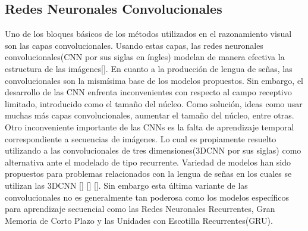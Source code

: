 \subsection{Redes Neuronales Convolucionales}\label{subsection:state-of-the-art:slp:CNN}
Uno de los bloques básicos de los métodos utilizados en el razonamiento visual son las capas convolucionales. Usando estas capas, las redes neuronales convolucionales(CNN por sus siglas en íngles) modelan de manera efectiva la estructura de las imágenes[\cite{LeCun1998GradientbasedLA}]. En cuanto a la producción de lengua de señas, las convolucionales son la mismísima base de los modelos propuestos. Sin embargo, el desarrollo de las CNN enfrenta inconvenientes con respecto al campo receptivo limitado, introducido como el tamaño del núcleo. Como solución, ideas como usar muchas más capas convolucionales, aumentar el tamaño del núcleo, entre otras. Otro inconveniente importante de las CNNs es la falta de aprendizaje temporal correspondiente a secuencias de imágenes. Lo cual es propiamente resuelto utilizando a las convolucionales de tres dimensiones(3DCNN por sus siglas) como alternativa ante el modelado de tipo recurrente. Variedad de modelos han sido propuestos para problemas relacionados con la lengua de señas en los cuales se utilizan las 3DCNN [\cite{Sharma2021ASL3DCNNAS}] [\cite{AlHammadi2020HandGR}] [\cite{2019ProceedingsOT}]. Sin embargo esta última variante de las convolucionales no es generalmente tan poderosa como los modelos específicos para aprendizaje secuencial como las Redes Neuronales Recurrentes, Gran Memoria de Corto Plazo y las Unidades con Escotilla Recurrentes(GRU).


